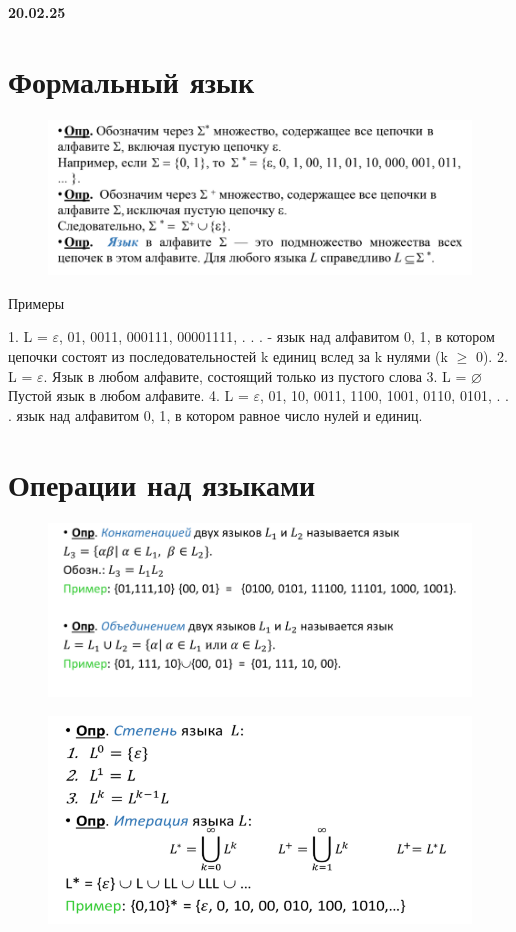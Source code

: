\documentclass{article}
\begin{document}
\textbf{20.02.25}

\section{Формальный язык}


\begin{figure}[H]
    \centering
    \includegraphics[width=1\linewidth]{image.png}
\end{figure}

Примеры

1. L = {$\varepsilon$, 01, 0011, 000111, 00001111, . . .} - язык над алфавитом
{0, 1}, в котором цепочки состоят из последовательностей k
единиц вслед за k нулями (k $\geq$ 0).
2. L = {$\varepsilon$}. Язык в любом алфавите, состоящий только из пустого
слова
3. L = $\varnothing$ Пустой язык в любом алфавите.
4. L = {$\varepsilon$, 01, 10, 0011, 1100, 1001, 0110, 0101, . . .} язык над
алфавитом {0, 1}, в котором равное число нулей и единиц.

\section{Операции над языками}
\begin{figure}[H]
    \centering
    \includegraphics[width=1\linewidth]{Снимок экрана 2025-02-20 084202.png}
\end{figure}

\begin{figure}[H]
    \centering
    \includegraphics[width=1\linewidth]{Снимок экрана 2025-02-20 084233.png}
\end{figure}
\end{document}
